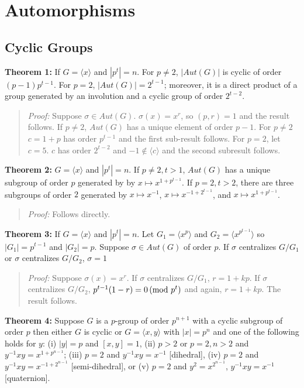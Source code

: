 \chapter{Automorphisms}
\section {Cyclic Groups}
{\bf Theorem 1:}
If $G= \langle x \rangle $ and $|p^t|=n$.  For $p \ne 2$, $|Aut(G)|$ is cyclic of order $(p-1)p^{t-1}$.
For $p=2$, $|Aut(G)|= 2^{t-1}$;
moreover, it is a direct product of a group generated by an  involution and a cyclic group of order $2^{t-2}$.
\begin{quote}
\emph{Proof:} Suppose $\sigma \in Aut(G)$.  $\sigma(x)= x^r$, so $(p,r)=1$ and the result follows.
If $p \ne 2$, $Aut(G)$ has a unique element of order $p-1$. For $p \ne 2$ $c= 1+p$
has order $p^{t-1}$ and the first sub-result follows.  For $p=2$, let $c=5$.  $c$ has order $2^{t-2}$ and
$-1 \notin \langle c \rangle$ and the second subresult follows.
\end{quote}
{\bf Theorem 2:} $G= \langle x \rangle $ and $|p^t|=n$.  If $p \ne 2, t>1$, $Aut(G)$ has a unique subgroup of order
$p$ generated by by $x \mapsto x^{1+p^{t-1}}$.  If $p=2, t > 2$, there are three subgroups of order $2$ generated by
$x \mapsto x^{-1}$,
$x \mapsto x^{-1 + 2^{t-1}}$, and
$x \mapsto x^{1 + p^{t-1}}$.
\begin{quote}
\emph{Proof:} Follows directly.
\end{quote}
{\bf Theorem 3:} If $G= \langle x \rangle $ and $|p^t|=n$. Let 
$G_1 = \langle x^{p} \rangle$ and
$G_2 = \langle x^{p^{t-1}} \rangle$ so $|G_1| = p^{t-1}$ and $|G_2|=p$. Suppose $\sigma \in Aut(G)$
of order $p$.
If $\sigma$ centralizes $G/G_1$ or $\sigma$ centralizes $G/G_2$, $\sigma = 1$
\begin{quote}
\emph{Proof:}  Suppose $\sigma(x) = x^r$.
If $\sigma$ centralizes $G/G_1$, $r=1+kp$.
If $\sigma$ centralizes $G/G_2$, $p^{t-1}(1-r) = 0 \thinspace \textnormal{(mod } p^t \textnormal{)}$ and again, $r=1+kp$.  The result follows.
\end{quote}
{\bf Theorem 4:} Suppose $G$ is a $p$-group of order $p^{n+1}$ with a cyclic subgroup of order $p$ then either
$G$ is cyclic or $G= \langle x, y \rangle$ with $|x|=p^n$ and one of the following holds for $y$:
(i) $|y| = p$ and $[x,y]=1$,
(ii) $p > 2$ or $p=2, n>2$ and $y^{-1}x y = x^{1+p^{n-1}}$;
(iii) $p=2$ and $y^{-1}x y = x^{-1}$ [dihedral],
(iv) $p=2$ and $y^{-1}x y = x^{-1 + 2^{n-1}}$ [semi-dihedral], or
(v) $p=2$ and $y^2= x^{2^{n-1}}$, $y^{-1} x y = x^{-1}$ [quaternion].
